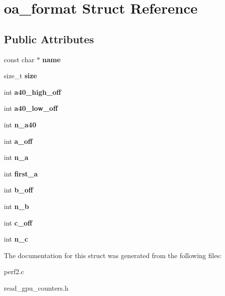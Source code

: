 \hypertarget{structoa__format}{}\section{oa\+\_\+format Struct Reference}
\label{structoa__format}
\subsection*{Public Attributes}
\begin{DoxyCompactItemize}
\item 
\mbox{\label{structoa__format_a37a9cbcb44d85adfc00ad0d16d440e4f}} 
const char $\ast$ {\bfseries name}
\item 
\mbox{\label{structoa__format_a8bf00940bb888bb2e3094fd8062b6095}} 
size\+\_\+t {\bfseries size}
\item 
\mbox{\label{structoa__format_a097fdd2bb7b2d630eabe16dc164d0967}} 
int {\bfseries a40\+\_\+high\+\_\+off}
\item 
\mbox{\label{structoa__format_ae7103a1ebe07bfe2d673fa59cdbd3a1c}} 
int {\bfseries a40\+\_\+low\+\_\+off}
\item 
\mbox{\label{structoa__format_aec3c015eb1709fe75af3c194561843cc}} 
int {\bfseries n\+\_\+a40}
\item 
\mbox{\label{structoa__format_a50f75501f5665c012c5b5ce9e2b3265b}} 
int {\bfseries a\+\_\+off}
\item 
\mbox{\label{structoa__format_a2c7817e0022bbaeb709a05fb7013ae9d}} 
int {\bfseries n\+\_\+a}
\item 
\mbox{\label{structoa__format_a07b5c7e498a08e2b3b642f677439507a}} 
int {\bfseries first\+\_\+a}
\item 
\mbox{\label{structoa__format_a1f14fb68a242f36c073841fdb8db9e88}} 
int {\bfseries b\+\_\+off}
\item 
\mbox{\label{structoa__format_a373a49b996a054572030759b75c1e888}} 
int {\bfseries n\+\_\+b}
\item 
\mbox{\label{structoa__format_a4b575f26a3dd597ca84c8cd6e09dd3bc}} 
int {\bfseries c\+\_\+off}
\item 
\mbox{\label{structoa__format_af7705ffcf3cdacd668280e41097e8210}} 
int {\bfseries n\+\_\+c}
\end{DoxyCompactItemize}


The documentation for this struct was generated from the following files\+:\begin{DoxyCompactItemize}
\item 
perf2.\+c\item 
read\+\_\+gpu\+\_\+counters.\+h\end{DoxyCompactItemize}
